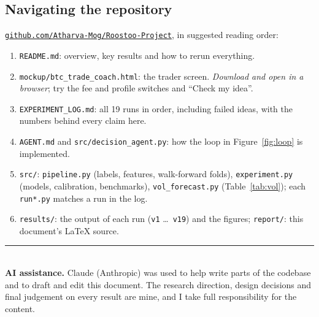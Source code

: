 \documentclass[10pt,a4paper]{article}
\begin{document}
\subsection*{Navigating the repository}
\href{https://github.com/Atharva-Mog/Roostoo-Project}{\texttt{github.com/Atharva-Mog/Roostoo-Project}}, in suggested reading order:
\begin{enumerate}[leftmargin=1.6em,itemsep=1pt,topsep=2pt]
  \item \texttt{README.md}: overview, key results and how to rerun everything.
  \item \texttt{mockup/btc\_trade\_coach.html}: the trader screen. \emph{Download and open in a browser}; try the fee and profile switches and ``Check my idea''.
  \item \texttt{EXPERIMENT\_LOG.md}: all 19 runs in order, including failed ideas, with the numbers behind every claim here.
  \item \texttt{AGENT.md} and \texttt{src/decision\_agent.py}: how the loop in Figure~\ref{fig:loop} is implemented.
  \item \texttt{src/}: \texttt{pipeline.py} (labels, features, walk-forward folds), \texttt{experiment.py} (models, calibration, benchmarks),
        \texttt{vol\_forecast.py} (Table~\ref{tab:vol}); each \texttt{run*.py} matches a run in the log.
  \item \texttt{results/}: the output of each run (\texttt{v1} \dots\ \texttt{v19}) and the figures; \texttt{report/}: this document's LaTeX source.
\end{enumerate}

\noindent\rule{\textwidth}{0.4pt}\\[1pt]
{\footnotesize\textbf{AI assistance.} Claude (Anthropic) was used to help write parts of the codebase and to draft and edit this
document. The research direction, design decisions and final judgement on every result are mine, and I take full
responsibility for the content.}
\end{document}
